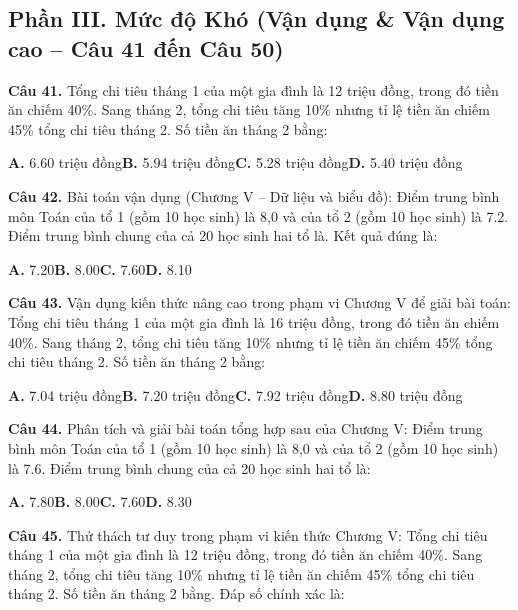 \documentclass[11pt,a4paper]{article}
\begin{document}
\subsection*{\color{accent} Phần III. Mức độ Khó (Vận dụng \& Vận dụng cao -- Câu 41 đến Câu 50)}
\textbf{\color{primary} Câu 41.} Tổng chi tiêu tháng 1 của một gia đình là 12 triệu đồng, trong đó tiền ăn chiếm 40\%. Sang tháng 2, tổng chi tiêu tăng 10\% nhưng tỉ lệ tiền ăn chiếm 45\% tổng chi tiêu tháng 2. Số tiền ăn tháng 2 bằng:\par
\hspace*{1.5em}\textbf{A.} 6.60 triệu đồng\quad\quad \textbf{B.} 5.94 triệu đồng\quad\quad \textbf{C.} 5.28 triệu đồng\quad\quad \textbf{D.} 5.40 triệu đồng\par\vspace{2pt}
\textbf{\color{primary} Câu 42.} Bài toán vận dụng (Chương V – Dữ liệu và biểu đồ): Điểm trung bình môn Toán của tổ 1 (gồm 10 học sinh) là 8,0 và của tổ 2 (gồm 10 học sinh) là 7.2. Điểm trung bình chung của cả 20 học sinh hai tổ là. Kết quả đúng là:\par
\hspace*{1.5em}\textbf{A.} 7.20\quad\quad \textbf{B.} 8.00\quad\quad \textbf{C.} 7.60\quad\quad \textbf{D.} 8.10\par\vspace{2pt}
\textbf{\color{primary} Câu 43.} Vận dụng kiến thức nâng cao trong phạm vi Chương V để giải bài toán: Tổng chi tiêu tháng 1 của một gia đình là 16 triệu đồng, trong đó tiền ăn chiếm 40\%. Sang tháng 2, tổng chi tiêu tăng 10\% nhưng tỉ lệ tiền ăn chiếm 45\% tổng chi tiêu tháng 2. Số tiền ăn tháng 2 bằng:\par
\hspace*{1.5em}\textbf{A.} 7.04 triệu đồng\quad\quad \textbf{B.} 7.20 triệu đồng\quad\quad \textbf{C.} 7.92 triệu đồng\quad\quad \textbf{D.} 8.80 triệu đồng\par\vspace{2pt}
\textbf{\color{primary} Câu 44.} Phân tích và giải bài toán tổng hợp sau của Chương V: Điểm trung bình môn Toán của tổ 1 (gồm 10 học sinh) là 8,0 và của tổ 2 (gồm 10 học sinh) là 7.6. Điểm trung bình chung của cả 20 học sinh hai tổ là:\par
\hspace*{1.5em}\textbf{A.} 7.80\quad\quad \textbf{B.} 8.00\quad\quad \textbf{C.} 7.60\quad\quad \textbf{D.} 8.30\par\vspace{2pt}
\textbf{\color{primary} Câu 45.} Thử thách tư duy trong phạm vi kiến thức Chương V: Tổng chi tiêu tháng 1 của một gia đình là 12 triệu đồng, trong đó tiền ăn chiếm 40\%. Sang tháng 2, tổng chi tiêu tăng 10\% nhưng tỉ lệ tiền ăn chiếm 45\% tổng chi tiêu tháng 2. Số tiền ăn tháng 2 bằng. Đáp số chính xác là:\par
\end{document}
